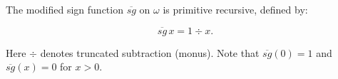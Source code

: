 The modified sign function $\overline{sg}$ on $\omega$ is primitive recursive, defined by:

$$\overline{sg}\,x = 1 \div x.$$

Here $\div$ denotes truncated subtraction (monus). Note that $\overline{sg}(0) = 1$ and $\overline{sg}(x) = 0$ for $x > 0$.
